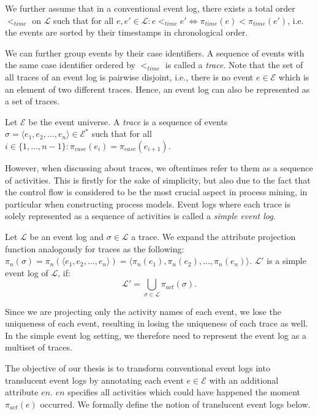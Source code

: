 We further assume that in a conventional event log, there exists a total order $<_{time}$ on $\mathcal{L}$ such that for all $e, e' \in \mathcal{L}: e <_{time} e' \Leftrightarrow \pi_{time}(e) < \pi_{time}(e')$, i.e. the events are sorted by their timestamps in chronological order.

We can further group events by their case identifiers. A sequence of events with the same case identifier ordered by $<_{time}$ is called a \emph{trace}. Note that the set of all traces of an event log is pairwise disjoint, i.e., there is no event $e \in \mathcal{E}$ which is an element of two different traces. Hence, an event log can also be represented as a set of traces.

\begin{definition}[Trace]
    Let $\mathcal{E}$ be the event universe. A \emph{trace} is a sequence of events $\sigma = \langle e_1, e_2, \dots, e_n \rangle \in \mathcal{E}^*$ such that for all $i \in \{1, \dots, n-1\}: \pi_{case}(e_i) = \pi_{case}(e_{i+1})$.
\end{definition}

However, when discussing about traces, we oftentimes refer to them as a sequence of activities. This is firstly for the sake of simplicity, but also due to the fact that the control flow is considered to be the most crucial aspect in process mining, in particular when constructing process models. Event logs where each trace is solely represented as a sequence of activities is called a \emph{simple event log}.

\begin{definition}
    Let $\mathcal{L}$ be an event log and $\sigma \in \mathcal{L}$ a trace. We expand the attribute projection function analogously for traces as the following: $\pi_n(\sigma) = \pi_n(\langle e_1, e_2, \dots, e_n \rangle) = \langle \pi_n(e_1), \pi_n(e_2), \dots, \pi_n(e_n) \rangle$. $\mathcal{L'}$ is a simple event log of $\mathcal{L}$, if:
    \[
        \mathcal{L'} = \bigcup\limits_{\sigma \in \mathcal{L}} \pi_{act}(\sigma).
    \]
\end{definition}

Since we are projecting only the activity names of each event, we lose the uniqueness of each event, resulting in losing the uniqueness of each trace as well. In the simple event log setting, we therefore need to represent the event log as a multiset of traces.

The objective of our thesis is to transform conventional event logs into translucent event logs by annotating each event $e \in \mathcal{E}$ with an additional attribute $en$. $en$ specifies all activities which could have happened the moment $\pi_{act}(e)$ occurred. We formally define the notion of translucent event logs below.

